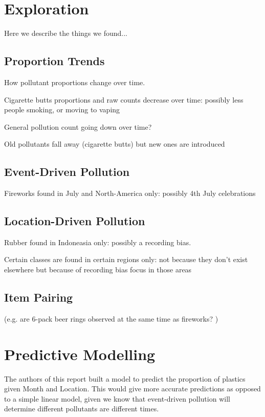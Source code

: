\documentclass[10pt]{article}\usepackage[]{graphicx}\usepackage[]{color}
\begin{document}
\begin{itemize}
\begin{itemize}
\end{itemize}

\section{Exploration}

Here we describe the things we found... 

\subsection{Proportion Trends}
How pollutant proportions change over time.

Cigarette butts proportions and raw counts decrease over time: possibly less people smoking, or moving to vaping

General pollution count going down over time?

Old pollutants fall away (cigarette butts) but new ones are introduced

\subsection{Event-Driven Pollution}

Fireworks found in July and North-America only: possibly 4th July celebrations

\subsection{Location-Driven Pollution}

Rubber found in Indoneasia only: possibly a recording bias.

Certain classes are found in certain regions only: not because they don't exist elsewhere but because of recording bias focus in those areas


\subsection{Item Pairing} 
(e.g. are 6-pack beer rings observed at the same time as fireworks? )


\section{Predictive Modelling}
The authors of this report built a model to predict the proportion of plastics given Month and Location. This would give more accurate predictions as opposed to a simple linear model, given we know that event-driven pollution will determine different pollutants are different times.


\end{itemize}
\end{document}
